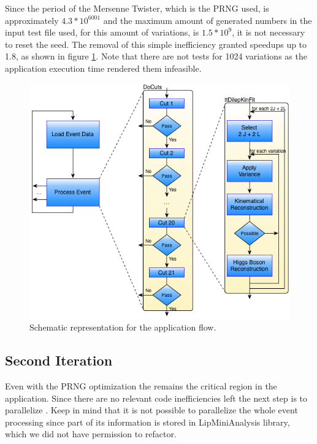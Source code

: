 Since the period of the Mersenne Twister, which is the PRNG used, is approximately $4.3 * 10^6001$ and the maximum amount of generated numbers in the input test file used, for this amount of variations, is $1.5 * 10^9$, it is not necessary to reset the seed. The removal of this simple inefficiency granted speedups up to 1.8, as shown in figure \ref{fig:PRNG}. Note that there are not tests for 1024 variations as the application execution time rendered them infeasible.

\begin{figure}[!htp]
	\begin{center}
		\includegraphics[scale=0.4]{images/graf_abstract_flow_with_kinfit.png}
		\caption{Schematic representation for the \tth application flow.}
		\label{fig:PRNG}
	\end{center}
\end{figure}

\subsection{Second Iteration}

Even with the PRNG optimization the \ttDilepKinFit remains the critical region in the application. Since there are no relevant code inefficiencies left the next step is to parallelize \ttDilepKinFit. Keep in mind that it is not possible to parallelize the whole event processing since part of its information is stored in LipMiniAnalysis library, which we did not have permission to refactor.


